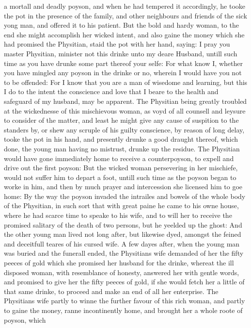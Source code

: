 a mortall and deadly poyson, and when he had tempered it accordingly, he tooke
the pot in the presence of the family, and other neighbours and friends of the
sick yong man, and offered it to his patient. But the bold and hardy woman, to
the end she might accomplish her wicked intent, and also gaine the money which
she had promised the Physitian, staid the pot with her hand, saying: I pray you
master Physitian, minister not this drinke unto my deare Husband, untill such
time as you have drunke some part thereof your selfe: For what know I, whether
you have mingled any poyson in the drinke or no, wherein I would have you not
to be offended: For I know that you are a man of wisedome and learning, but
this I do to the intent the conscience and love that I beare to the health and
safeguard of my husband, may be apparent. The Physitian being greatly troubled
at the wickednesse of this mischievous woman, as voyd of all counsell and
leysure to consider of the matter, and least he might give any cause of
suspition to the standers by, or shew any scruple of his guilty conscience, by
reason of long delay, tooke the pot in his hand, and presently drunke a good
draught thereof, which done, the young man having no mistrust, drunke up the
residue. The Physitian would have gone immediately home to receive a
counterpoyson, to expell and drive out the first poyson: But the wicked woman
persevering in her mischiefe, would not suffer him to depart a foot, untill
such time as the poyson began to worke in him, and then by much prayer and
intercession she licensed him to goe home: By the way the poyson invaded the
intrailes and bowels of the whole body of the Physitian, in such sort that with
great paine he came to his owne house, where he had scarce time to speake to
his wife, and to will her to receive the promised salitary of the death of two
persons, but he yeelded up the ghost: And the other young man lived not long
after, but likewise dyed, amongst the feined and deceitfull teares of his
cursed wife. A few dayes after, when the young man was buried and the funerall
ended, the Physitians wife demanded of her the fifty peeces of gold which she
promised her husband for the drinke, whereat the ill disposed woman, with
resemblance of honesty, answered her with gentle words, and promised to give
her the fifty peeces of gold, if she would fetch her a little of that same
drinke, to proceed and make an end of all her enterprise. The Physitians wife
partly to winne the further favour of this rich woman, and partly to gaine the
money, ranne incontinently home, and brought her a whole roote of poyson, which
